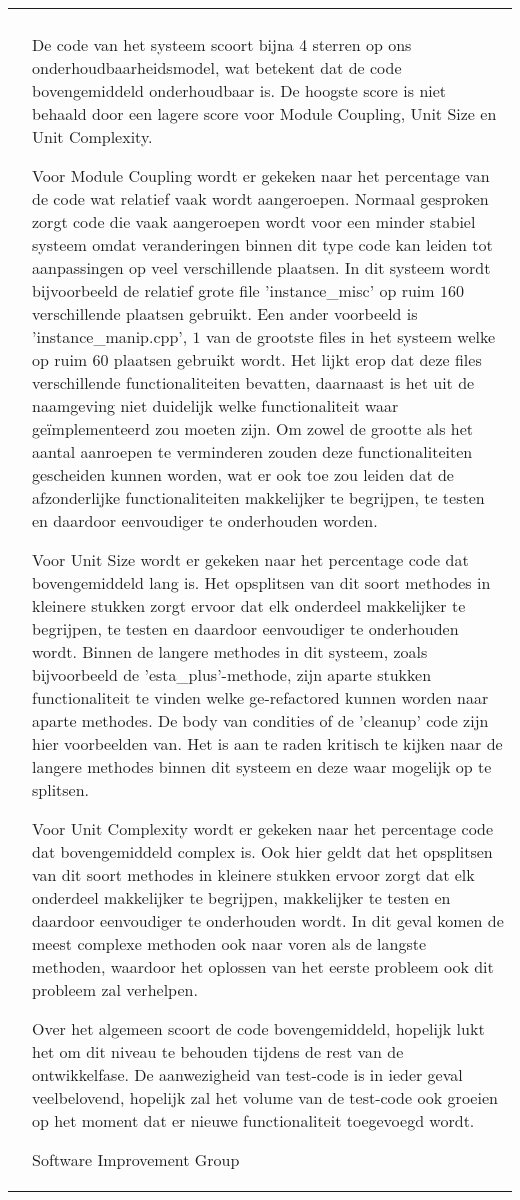 \begin{tabular}{p{0.5cm} | p{\textwidth - 2cm} |}
\cline{2-2}
 & \\ & \setlength{\parskip}{5pt}
De code van het systeem scoort bijna 4 sterren op ons onderhoudbaarheidsmodel, wat betekent dat de code bovengemiddeld onderhoudbaar is. De hoogste score is niet behaald door een lagere score voor Module Coupling, Unit Size en Unit Complexity.

Voor Module Coupling wordt er gekeken naar het percentage van de code wat relatief vaak wordt aangeroepen. Normaal gesproken zorgt code die vaak aangeroepen wordt voor een minder stabiel systeem omdat veranderingen binnen dit type code kan leiden tot aanpassingen op veel verschillende plaatsen. In dit systeem wordt bijvoorbeeld de relatief grote file 'instance\_misc' op ruim $160$ verschillende plaatsen gebruikt. Een ander voorbeeld is 'instance\_manip.cpp', $1$ van de grootste files in het systeem welke op ruim $60$ plaatsen gebruikt wordt. Het lijkt erop dat deze files verschillende functionaliteiten bevatten, daarnaast is het uit de naamgeving niet duidelijk welke functionaliteit waar geïmplementeerd zou moeten zijn. Om zowel de grootte als het aantal aanroepen te verminderen zouden deze functionaliteiten gescheiden kunnen worden, wat er ook toe zou leiden dat de afzonderlijke functionaliteiten makkelijker te begrijpen, te testen en daardoor eenvoudiger te onderhouden worden.

Voor Unit Size wordt er gekeken naar het percentage code dat bovengemiddeld lang is. Het opsplitsen van dit soort methodes in kleinere stukken zorgt ervoor dat elk onderdeel makkelijker te begrijpen, te testen en daardoor eenvoudiger te onderhouden wordt. Binnen de langere methodes in dit systeem, zoals bijvoorbeeld de 'esta\_plus'-methode, zijn aparte stukken functionaliteit te vinden welke ge-refactored kunnen worden naar aparte methodes. De body van condities of de 'cleanup' code zijn hier voorbeelden van. Het is aan te raden kritisch te kijken naar de langere methodes binnen dit systeem en deze waar mogelijk op te splitsen.

Voor Unit Complexity wordt er gekeken naar het percentage code dat bovengemiddeld complex is. Ook hier geldt dat het opsplitsen van dit soort methodes in kleinere stukken ervoor zorgt dat elk onderdeel makkelijker te begrijpen, makkelijker te testen en daardoor eenvoudiger te onderhouden wordt. In dit geval komen de meest complexe methoden ook naar voren als de langste methoden, waardoor het oplossen van het eerste probleem ook dit probleem zal verhelpen.

Over het algemeen scoort de code bovengemiddeld, hopelijk lukt het om dit niveau te behouden tijdens de rest van de ontwikkelfase. De aanwezigheid van test-code is in ieder geval veelbelovend, hopelijk zal het volume van de test-code ook groeien op het moment dat er nieuwe functionaliteit toegevoegd wordt. 

\hfill Software Improvement Group \\
\cline{2-2}
\end{tabular}

